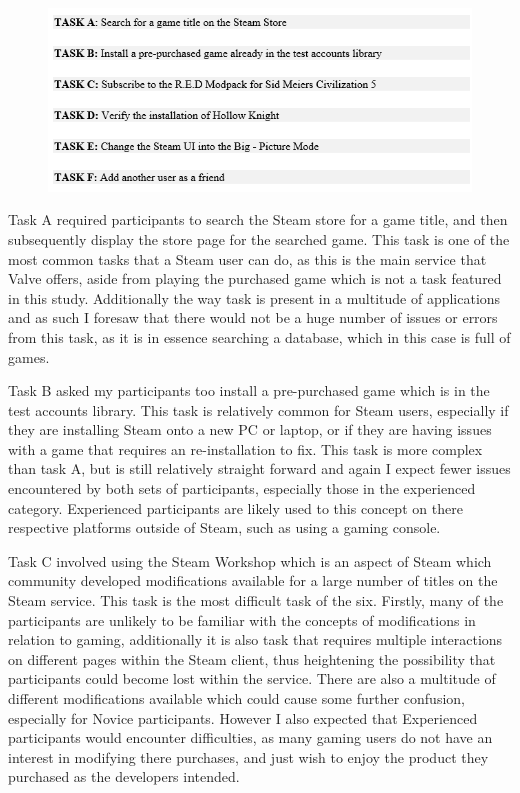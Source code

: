 \begin{figure}[H]
    \centering
    \includegraphics{Screenshots/StudyMaterialScreenshots/tasklist.png}
\end{figure} 

Task A required participants to search the Steam store for a game title, and then subsequently display the store page for the searched game. This task is one of the most common tasks that a Steam user can do, as this is the main service that Valve offers, aside from playing the purchased game which is not a task featured in this study. Additionally the way task is present in a multitude of applications and as such I foresaw that there would not be a huge number of issues or errors from this task, as it is in essence searching a database, which in this case is full of games. 

Task B asked my participants too install a pre-purchased game which is in the test accounts library. This task is relatively common for Steam users, especially if they are installing Steam onto a new PC or laptop, or if they are having issues with a game that requires an re-installation to fix. This task is more complex than task A, but is still relatively straight forward and again I expect fewer issues encountered by both sets of participants, especially those in the experienced category. Experienced participants are likely used to this concept on there respective platforms outside of Steam, such as using a gaming console.  

Task C involved using the Steam Workshop which is an aspect of Steam which community developed modifications available for a large number of titles on the Steam service. This task is the most difficult task of the six. Firstly, many of the participants are unlikely to be familiar with the concepts of modifications in relation to gaming, additionally it is also task that requires multiple interactions on different pages within the Steam client, thus heightening the possibility that participants could become lost within the service. There are also a multitude of different modifications available which could cause some further confusion, especially for Novice participants. However I also expected that Experienced participants would encounter difficulties, as many gaming users do not have an interest in modifying there purchases, and just wish to enjoy the product they purchased as the developers intended.

